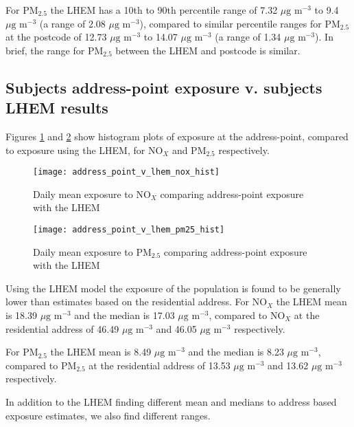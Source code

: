 For PM$_{2.5}$ the LHEM has a 10th to 90th percentile range of 7.32 $\mu \text{g m}^{-3}$ to 9.4 $\mu \text{g m}^{-3}$ (a range of 2.08 $\mu \text{g m}^{-3}$), compared to similar percentile ranges for PM$_{2.5}$ at the postcode of 12.73 $\mu \text{g m}^{-3}$ to 14.07 $\mu \text{g m}^{-3}$ (a range of 1.34 $\mu \text{g m}^{-3}$). In brief, the range for PM$_{2.5}$ between the LHEM and postcode is similar.

\subsection{Subjects address-point exposure v. subjects LHEM results}
\label{subsec:address_point_v_lhem}

Figures \ref{fig:address_point_v_lhem_nox_hist} and \ref{fig:address_point_v_lhem_pm25_hist} show histogram plots of exposure at the address-point, compared to exposure using the LHEM, for NO$_{X}$ and PM$_{2.5}$ respectively.

\begin{figure}[H]
\centering
\texttt{[image: address\_point\_v\_lhem\_nox\_hist]}
\caption{Daily mean exposure to NO$_{X}$ comparing address-point exposure with the LHEM}
\label{fig:address_point_v_lhem_nox_hist}
\end{figure}

\begin{figure}[H]
\centering
\texttt{[image: address\_point\_v\_lhem\_pm25\_hist]}
\caption{Daily mean exposure to PM$_{2.5}$ comparing address-point exposure with the LHEM}
\label{fig:address_point_v_lhem_pm25_hist}
\end{figure}

Using the LHEM model the exposure of the population is found to be generally lower than estimates based on the residential address. For NO$_{X}$ the LHEM mean is 18.39 $\mu \text{g m}^{-3}$ and the median is 17.03 $\mu \text{g m}^{-3}$, compared to NO$_{X}$ at the residential address of 46.49 $\mu \text{g m}^{-3}$ and 46.05 $\mu \text{g m}^{-3}$ respectively.

For PM$_{2.5}$ the LHEM mean is 8.49 $\mu \text{g m}^{-3}$ and the median is 8.23 $\mu \text{g m}^{-3}$, compared to PM$_{2.5}$ at the residential address of 13.53 $\mu \text{g m}^{-3}$ and 13.62 $\mu \text{g m}^{-3}$ respectively.

In addition to the LHEM finding different mean and medians to address based exposure estimates, we also find different ranges.

